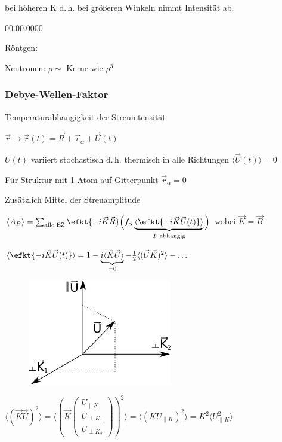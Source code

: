 bei h\"oheren K d.\,h. bei gr\"o\ss eren Winkeln nimmt Intensit\"at ab.
\begin{labeling}{00.00.0000}
\item [{R\"ontgen:}] 
\item [{Neutronen:}] $\rho\sim$ Kerne wie $\rho^{3}$
\end{labeling}

\subsubsection{Debye-Wellen-Faktor}

%
Temperaturabh\"angigkeit der Streuintensit\"at

$\vec{r}\to\vec{r}(t)=\vec{R}+\vec{r}_{\alpha}+\vec{U}(t)$

$U(t)$ variiert stochastisch d.\,h. thermisch in alle Richtungen
$\langle \vec{U}(t)\rangle =0$

F\"ur Struktur mit 1 Atom auf Gitterpunkt $\vec{r}_{\alpha}=0$

Zus\"atzlich Mittel der Streuamplitude

$\langle A_{B}\rangle =\sum_{\text{alle EZ}}\efkt{-i\vec{K}\vec{R}}\Big(f_{\alpha}\underbrace{\langle \efkt{-i\vec{K}\vec{U}(t)}\rangle }_{T\text{ abh\"{a}ngig}}\Big)$
wobei $\vec{K}=\vec{B}$

$\langle \efkt{-i\vec{K}\vec{U}(t)}\rangle =1-\underbrace{i\langle \vec{K}\vec{U}\rangle }_{=0}-\frac{1}{2}\langle (\vec{U}\vec{K})^{2}\rangle -\ldots$

\begin{figure}\includegraphics{images/2009-11-05-uparallel.png}\end{figure}

$\langle (\vec{K}\vec{U})^{2}\rangle =\langle \left(\vec{K}\left(\begin{array}{c}
U_{\parallel K}\\
U_{\perp K_{1}}\\
U_{\perp K_{2}}\end{array}\right)\right)^{2}\rangle =\langle (KU_{\parallel K})^{2}\rangle =K^{2}\langle U_{\parallel K}^{2}\rangle $

